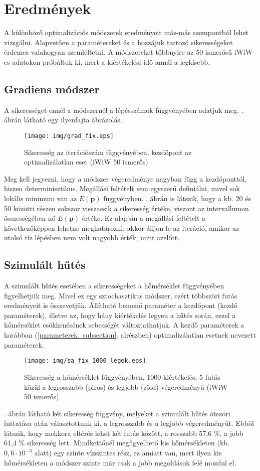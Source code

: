 \documentclass[12pt]{article}
\begin{document}
\section{Eredmények}
A különböző optimalizációs módszerek eredményeit más-más szempontból lehet vizsgálni. Alapvetően a paramétereket és a hozzájuk tartozó sikerességeket érdemes valahogyan szemléltetni. A módszereket többnyire az 50 ismerősű iWiW-es adatokon próbáltuk ki, mert a kiértékelési idő annál a legkisebb.

\subsection{Gradiens módszer}
A sikerességet ennél a módszernél a lépésszámok függvényében adatjuk meg. . ábrán látható egy ilyenfajta ábrázolás.
\begin{figure}[H]
	\centering
	\texttt{[image: img/grad\_fix.eps]}
	\caption{Sikeresség az iterációszám függvényében, kezdőpont az optimalizálatlan eset (iWiW 50 ismerős)}
	\label{grad_fix}
\end{figure}
Meg kell jegyezni, hogy a módszer végeredménye nagyban függ a kezdőponttól, hiszen determinisztikus. Megállási feltételt sem egyszerű definiálni, mivel sok lokális minimum van az $E(\mathbf{p})$ függvényben. . ábrán is látszik, hogy a kb. 20 és 50 közötti részen sokszor visszaesik a sikeresség értéke, viszont az intervallumon összességében nő $E(\mathbf{p})$ értéke. Ez alapján a megállási feltételt a következőképpen lehetne meghatározni: akkor álljon le az iteráció, amikor az utolsó tíz lépésben nem volt nagyobb érték, mint azelőtt. %
\subsection{Szimulált hűtés}
A szimulált hűtés esetében a sikerességeket a hőmérséklet függvényében figyelhetjük meg. %
Mivel ez egy sztochasztikus módszer, ezért többszöri futás eredményeit is összevetjük. %
Állítható bemenő paraméter a kezdőpont (kezdő paraméterek), illetve az, hogy hány kiértékelés legyen a hűtés során, ezzel a hőmérséklet csökkenésének sebességét változtathatjuk. A kezdő paraméterek a korábban (\ref{parameterek_subsection}. alrészben) optimalizálatlan esetnek nevezett paraméterek. %
\begin{figure}[H]
	\centering
	\texttt{[image: img/sa\_fix\_1000\_legek.eps]}
	\caption{Sikeresség a hőmérséklet függvényében, 1000 kiértékelés, 5 futás közül a legrosszabb (piros) és legjobb (zöld) végeredményű (iWiW 50 ismerős)}
	\label{sa_legek}
\end{figure}
. ábrán látható két sikeresség függvény, melyeket a szimulált hűtés ötszöri futtatása után választottunk ki, a legrosszabb és a legjobb végeredményűt. Ebből látszik, hogy mekkora eltérés lehet két futás között, a rosszabb 57,6 \%, a jobb 61,4 \% sikeresség lett. Mindkettőnél megfigyelhető kis hőmérsékleten (kb. $0,6 \cdot 10^{-3}$ alatt) egy szinte vízszintes rész, ez amiatt van, mert ilyen kis hőmérsékleten a módszer szinte már csak a jobb megoldások felé mozdul el.
\end{document}
